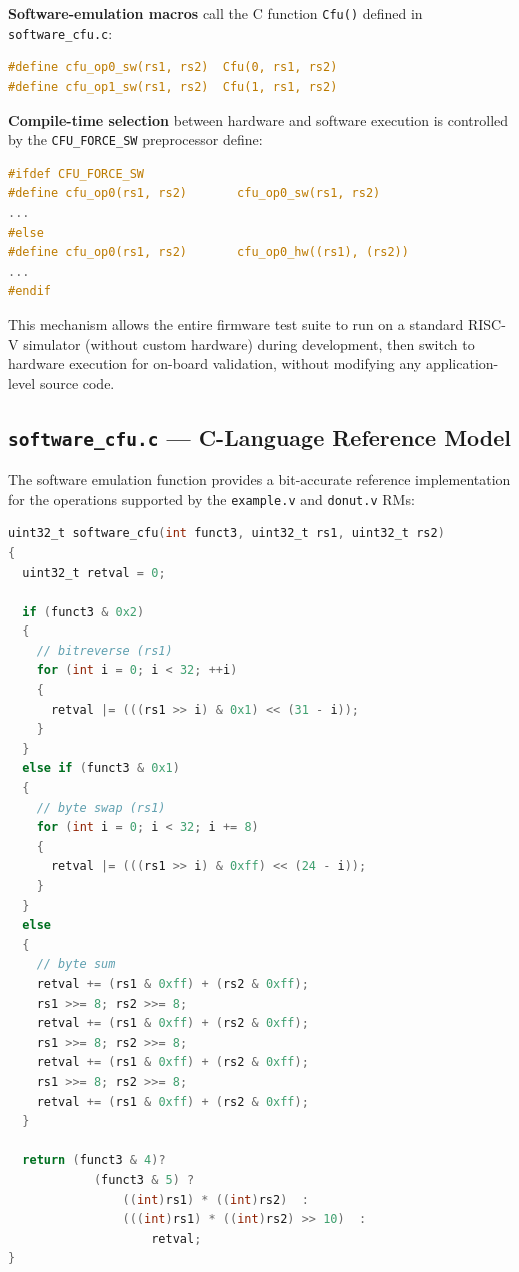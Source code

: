 \textbf{Software-emulation macros} call the C function \texttt{Cfu()} defined in \texttt{software\_cfu.c}:

\begin{lstlisting}[style=mystyle, language=C]
#define cfu_op0_sw(rs1, rs2)  Cfu(0, rs1, rs2)
#define cfu_op1_sw(rs1, rs2)  Cfu(1, rs1, rs2)
\end{lstlisting}

\textbf{Compile-time selection} between hardware and software execution is controlled by the \texttt{CFU\_FORCE\_SW} preprocessor define:

\begin{lstlisting}[style=mystyle, language=C]
#ifdef CFU_FORCE_SW
#define cfu_op0(rs1, rs2)       cfu_op0_sw(rs1, rs2)
...
#else
#define cfu_op0(rs1, rs2)       cfu_op0_hw((rs1), (rs2))
...
#endif
\end{lstlisting}

This mechanism allows the entire firmware test suite to run on a standard RISC-V simulator (without custom hardware) during development, then switch to hardware execution for on-board validation, without modifying any application-level source code.

\subsection{\texttt{software\_cfu.c} — C-Language Reference Model}

The software emulation function provides a bit-accurate reference implementation for the operations supported by the \texttt{example.v} and \texttt{donut.v} RMs:

\begin{lstlisting}[style=mystyle, language=C]
uint32_t software_cfu(int funct3, uint32_t rs1, uint32_t rs2)
{
  uint32_t retval = 0;

  if (funct3 & 0x2)
  {
    // bitreverse (rs1)
    for (int i = 0; i < 32; ++i)
    {
      retval |= (((rs1 >> i) & 0x1) << (31 - i));
    }
  }
  else if (funct3 & 0x1)
  {
    // byte swap (rs1)
    for (int i = 0; i < 32; i += 8)
    {
      retval |= (((rs1 >> i) & 0xff) << (24 - i));
    }
  }
  else
  {
    // byte sum
    retval += (rs1 & 0xff) + (rs2 & 0xff);
    rs1 >>= 8; rs2 >>= 8;
    retval += (rs1 & 0xff) + (rs2 & 0xff);
    rs1 >>= 8; rs2 >>= 8;
    retval += (rs1 & 0xff) + (rs2 & 0xff);
    rs1 >>= 8; rs2 >>= 8;
    retval += (rs1 & 0xff) + (rs2 & 0xff);
  }

  return (funct3 & 4)?
            (funct3 & 5) ?
                ((int)rs1) * ((int)rs2)  :
                (((int)rs1) * ((int)rs2) >> 10)  :
                    retval;
}
\end{lstlisting}

